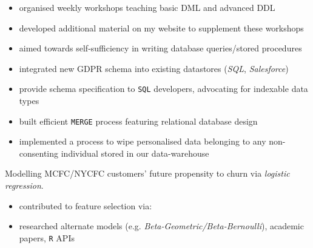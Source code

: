 \documentclass[../cv.tex]{subfiles}
\begin{document}
\begin{description}[style=multiline,leftmargin=3cm]
\begin{description}[style=multiline,leftmargin=3cm]
\begin{itemize}
			            \item organised weekly workshops teaching basic DML and advanced DDL
			            \item developed additional material on my website to supplement these workshops
			            \item aimed towards self-sufficiency in writing database queries/stored procedures
		            \end{itemize}
	      \end{description}
	\item[GDPR Pipeline \textnormal{Technical Lead}]
	      \begin{itemize}
		      \item integrated new GDPR schema into existing datastores (\textit{SQL}, \textit{Salesforce})
		      \item provide schema specification to \texttt{SQL} developers, advocating for indexable data types
		      \item built efficient \texttt{MERGE} process featuring relational database design
		      \item implemented a process to wipe personalised data belonging to any non-consenting individual stored in our data-warehouse
	      \end{itemize}
	\item[Customer Churn Model]
	      Modelling MCFC/NYCFC customers' future propensity to churn via \textit{logistic regression}.
	      \begin{itemize}
		      \item contributed to feature selection via:
		      \item researched alternate models (e.g. \textit{Beta-Geometric/Beta-Bernoulli}), academic papers, \texttt{R} APIs
	      \end{itemize}
\end{description}
\end{document}
